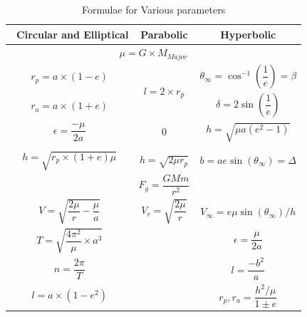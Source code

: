 \begin{table}[H]
\centering
\begin{tabular}{ccc}
\
\textbf{Circular and Elliptical}           & \textbf{Parabolic}               & \textbf{Hyperbolic}                             \\ \hline
\multicolumn{3}{c}{$\mu=G\times M_{Major}$}                                                                                                                               \\ 
\multicolumn{1}{c|}{$r_p=a\times (1-e)$}                        & \multicolumn{1}{c|}{\multirow{2}{*}{$l=2\times r_p$}} & $\theta_\infty = \cos^{-1}(\dfrac{1}{e})=\beta$ \\
\multicolumn{1}{c|}{$r_a=a\times (1+e)$}                        & \multicolumn{1}{c|}{}                                 & $\delta = 2\sin(\dfrac{1}{e})$                  \\
\multicolumn{1}{c|}{$\epsilon = \dfrac{-\mu}{2a}$}              & \multicolumn{1}{c|}{$0$}                              & $h=\sqrt{\mu a(e^2-1)}$                         \\
\multicolumn{1}{l|}{}                                           & \multicolumn{1}{l|}{}                                 & \multicolumn{1}{l}{}                            \\
\multicolumn{1}{c|}{$h=\sqrt{r_p\times(1+e)\mu}$}               & \multicolumn{1}{c|}{$h=\sqrt{2\mu r_p}$}              & $b=ae\sin(\theta_\infty)=\Delta$                \\
\multicolumn{1}{l}{}                                            & \multirow{2}{*}{$F_g=\dfrac{GMm}{r^2}$}               & \multicolumn{1}{l}{}                            \\
                                                                &                                                       &                                                 \\
\multicolumn{1}{c|}{$V= \sqrt{\dfrac{2\mu}{r}-\dfrac{\mu}{a}}$} & \multicolumn{1}{c|}{$V_r=\sqrt{\dfrac{2\mu}{r}}$}     & $V_\infty=e\mu\sin(\theta_\infty)/h$            \\
\multicolumn{1}{c|}{$T = \sqrt{\dfrac{4\pi^2}{\mu}\times a^3}$} & \multicolumn{1}{c|}{}                                 & $\epsilon=\dfrac{\mu}{2a}$                      \\
\multicolumn{1}{c|}{$n = \dfrac{2 \pi}{T}$}                     & \multicolumn{1}{c|}{}                                 & $l=\dfrac{-b^2}{a}$                             \\
\multicolumn{1}{c|}{$l=a\times(1-e^2)$}                         & \multicolumn{1}{c|}{}                                 & $r_p,r_a = \dfrac{h^2/\mu}{1 \pm e}$           
\end{tabular}
\caption{Formulae for Various parameters}
\label{tab:vpco}
\end{table}

